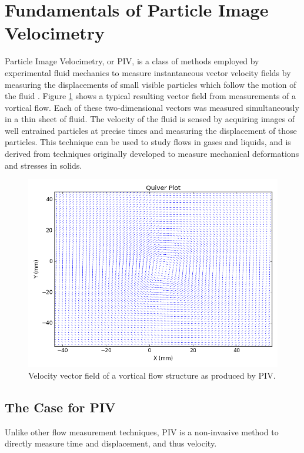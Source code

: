 \section{Fundamentals of Particle Image Velocimetry}

Particle Image Velocimetry, or PIV, is a class of methods employed by 
experimental fluid mechanics to measure instantaneous vector velocity fields by 
measuring the displacements of small visible particles which follow the motion 
of the fluid \cite{adrian2011}. Figure \ref{fig:quiver_example} shows a typical 
resulting vector field from measurements of a vortical flow. Each of these 
two-dimensional vectors was measured simultaneously in a thin sheet of fluid. 
The velocity of the fluid is sensed by acquiring images of well entrained 
particles at precise times and measuring the displacement of those particles. 
This technique can be used to study flows in gases and liquids, and is derived 
from techniques originally developed to measure mechanical 
deformations and stresses in solids.

\begin{figure}[H]
	\centering
	\includegraphics[width=5in]{figs/example_vortex_figs/example_quiver}
	\caption{Velocity vector field of a vortical flow structure as produced by 
	PIV.}
	\label{fig:quiver_example}
\end{figure}

 
\subsection{The Case for PIV}

Unlike other flow measurement techniques, PIV is a non-invasive method to 
directly measure time and displacement, and thus velocity.

